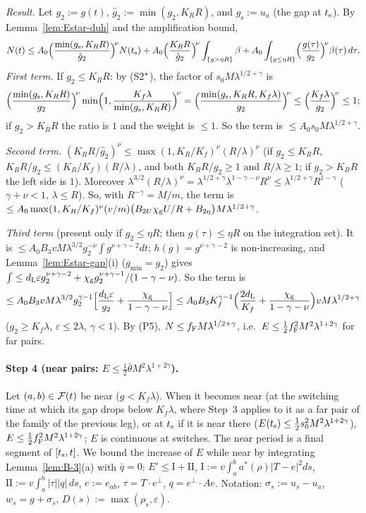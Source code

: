 \emph{Result.} Let $g_2:=g(t)$, $\hat g_2:=\min(g_2,K_RR)$, and $g_{\mathrm s}:=u_a$ (the gap at $t_{\mathrm s}$). By
Lemma~\ref{lem:Estar-duh} and the amplification bound,
\[
N(t)\le A_0\Bigl(\frac{\min(g_{\mathrm s},K_RR)}{\hat g_2}\Bigr)^{\!\nu}N(t_{\mathrm s})+A_0\Bigl(\frac{K_RR}{\hat g_2}\Bigr)^{\!\nu}
\int_{\{g>\eta R\}}\beta+A_0\int_{\{g\le\eta R\}}\Bigl(\frac{g(\tau)}{g_2}\Bigr)^{\!\nu}\beta(\tau)\,d\tau .
\]
\emph{First term.} If $g_2\le K_RR$: by (S2$^{*}$), the factor of $s_0M\lambda^{1/2+\gamma}$ is
\[
\Bigl(\frac{\min(g_{\mathrm s},K_RR)}{g_2}\Bigr)^{\!\nu}\min\Bigl(1,\frac{K_f\lambda}{\min(g_{\mathrm s},K_RR)}\Bigr)^{\!\nu}
=\Bigl(\frac{\min(g_{\mathrm s},K_RR,K_f\lambda)}{g_2}\Bigr)^{\!\nu}\le\Bigl(\frac{K_f\lambda}{g_2}\Bigr)^{\!\nu}\le1;
\]
if $g_2>K_RR$ the ratio is $1$ and the weight is $\le1$. So the term is $\le A_0s_0M\lambda^{1/2+\gamma}$.

\emph{Second term.} $(K_RR/\hat g_2)^\nu\le\max(1,K_R/K_f)^\nu(R/\lambda)^\nu$ (if $g_2\le K_RR$, $K_RR/g_2\le(K_R/K_f)(R/\lambda)$,
and both $K_RR/g_2\ge1$ and $R/\lambda\ge1$; if $g_2>K_RR$ the left side is $1$). Moreover
$\lambda^{3/2}(R/\lambda)^\nu=\lambda^{1/2+\gamma}\lambda^{1-\gamma-\nu}R^\nu\le\lambda^{1/2+\gamma}R^{1-\gamma}$ ($\gamma+\nu<1$,
$\lambda\le R$). So, with $R^{-\gamma}=M/m$, the term is
$\le A_0\max(1,K_R/K_f)^\nu(v/m)\bigl(B_{2U}\chi_{\mathrm g} U/R+B_{2\eta}\bigr)M\lambda^{1/2+\gamma}$.

\emph{Third term} (present only if $g_2\le\eta R$; then $g(\tau)\le\eta R$ on the integration set). It is
$\le A_0B_3vM\lambda^{3/2}g_2^{-\nu}\int g^{\nu+\gamma-2}dt$; $h(g)=g^{\nu+\gamma-2}$ is non-increasing, and
Lemma~\ref{lem:Estar-gap}(i) ($g_{\min}=g_2$) gives $\int\le d_{\mathrm L}\varepsilon g_2^{\nu+\gamma-2}+\chi_{\mathrm g} g_2^{\nu+\gamma-1}/(1-\gamma-\nu)$.
So the term is
\[
\le A_0B_3vM\lambda^{3/2}g_2^{\gamma-1}\Bigl[\frac{d_{\mathrm L}\varepsilon}{g_2}+\frac{\chi_{\mathrm g}}{1-\gamma-\nu}\Bigr]
\le A_0B_3K_f^{\gamma-1}\Bigl(\frac{2d_{\mathrm L}}{K_f}+\frac{\chi_{\mathrm g}}{1-\gamma-\nu}\Bigr)vM\lambda^{1/2+\gamma}
\]
($g_2\ge K_f\lambda$, $\varepsilon\le2\lambda$, $\gamma<1$). By \textup{(P5)}, $N\le f_{\mathrm F} M\lambda^{1/2+\gamma}$, i.e.\
$E\le\frac12f_{\mathrm F}^2M^2\lambda^{1+2\gamma}$ for far pairs.

\paragraph{Step 4 (near pairs: $E\le\frac12\bar\theta M^2\lambda^{1+2\gamma}$).}
Let $(a,b)\in\mathcal F(t)$ be near ($g<K_f\lambda$). When it becomes near (at the switching time at which its gap drops below $K_f\lambda$,
where Step~3 applies to it as a far pair of the family of the previous leg), or at $t_{\mathrm s}$ if it is near there
($E(t_{\mathrm s})\le\frac12s_0^2M^2\lambda^{1+2\gamma}$), $E\le\frac12f_{\mathrm F}^2M^2\lambda^{1+2\gamma}$; $E$ is continuous at switches. The near
period is a final segment of $[t_{\mathrm s},t]$. We bound the increase of $E$ while near by integrating Lemma~\ref{lem:B-3}(a) with $\bar q=0$:
$E'\le\mathrm I+\mathrm{II}$, $\mathrm I:=v\int_a^ba^*(\rho)|T-e|^2ds$, $\mathrm{II}:=v\int_a^b|\tau||q|\,ds$, $e:=e_{ab}$,
$\tau=T\cdot e^\perp$, $q=e^\perp\cdot Ae$. Notation: $\sigma_s:=u_s-u_a$, $w_s=g+\sigma_s$, $D(s):=\max(\rho_s,\varepsilon)$.

